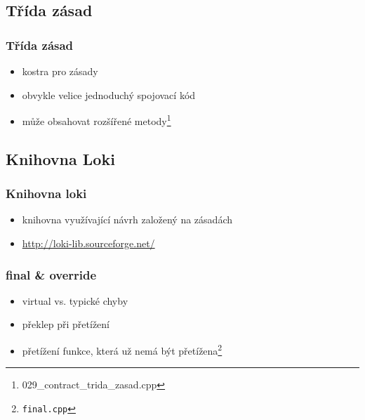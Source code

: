 	\subsection{Třída zásad}

	\begin{frame}
		\frametitle{Třída zásad}
		\begin{itemize}
			\item{kostra pro zásady}
			\item{obvykle velice jednoduchý spojovací kód}
			\item{může obsahovat rozšířené metody\footnote{029\_contract\_trida\_zasad.cpp}}
		\end{itemize}
	\end{frame}

	\subsection{Knihovna Loki}

	\begin{frame}
		\frametitle{Knihovna loki}
		\begin{itemize}
			\item{knihovna využívající návrh založený na zásadách}
			\item{\url{http://loki-lib.sourceforge.net/}}
		\end{itemize}
	\end{frame}








\begin{frame} \frametitle{final \& override}
	\begin{itemize}
		\item{virtual vs. typické chyby}
		\item{překlep při přetížení}
		\item{přetížení funkce, která už nemá být přetížena\footnote{\texttt{final.cpp}}}
	\end{itemize}
\end{frame}


